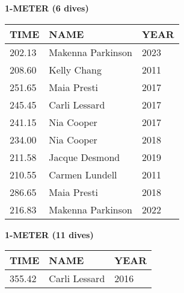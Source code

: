 \begin{center}
\begin{minipage}[t]{0.7\textwidth}
\centering
\textbf{1-METER (6 dives)}\\[0.05cm]
\begin{tabular}{@{}p{1.8cm}p{2.8cm}p{1.2cm}@{}}
\hline
\textbf{TIME} & \textbf{NAME} & \textbf{YEAR} \\
\hline
202.13 & Makenna Parkinson & 2023 \\
208.60 & Kelly Chang & 2011 \\
251.65 & Maia Presti & 2017 \\
245.45 & Carli Lessard & 2017 \\
241.15 & Nia Cooper & 2017 \\
234.00 & Nia Cooper & 2018 \\
211.58 & Jacque Desmond & 2019 \\
210.55 & Carmen Lundell & 2011 \\
286.65 & Maia Presti & 2018 \\
216.83 & Makenna Parkinson & 2022 \\
\hline
\end{tabular}
\end{minipage}
\end{center}

\vspace{0.4cm}

\begin{center}
\begin{minipage}[t]{0.7\textwidth}
\centering
\textbf{1-METER (11 dives)}\\[0.05cm]
\begin{tabular}{@{}p{1.8cm}p{2.8cm}p{1.2cm}@{}}
\hline
\textbf{TIME} & \textbf{NAME} & \textbf{YEAR} \\
\hline
355.42 & Carli Lessard & 2016 \\
\hline
\end{tabular}
\end{minipage}
\end{center}

\vspace{0.4cm}

